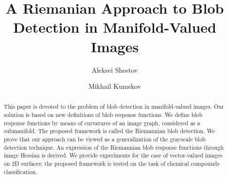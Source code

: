 \documentclass{llncs}
\begin{document}
\title{A Riemanian Approach to Blob Detection in Manifold-Valued Images}%

\author{Aleksei Shestov \and Mikhail Kumskov} 

\maketitle              %

\begin{abstract}
%
This paper is devoted to the problem of blob detection in manifold-valued images. Our solution is based on new definitions of blob response functions. We define blob response functions by means of curvatures of an image graph, considered as a submanifold. The proposed framework is called the Riemannian blob detection. We prove that our approach can be viewed as a generalization of the grayscale blob detection technique. An expression of the Riemannian blob response functions through image Hessian is derived. We provide experiments for the case of vector-valued images on 2D surfaces: the proposed framework is tested on the task of chemical compounds classification.
 \end{abstract}  
%
\end{document}

